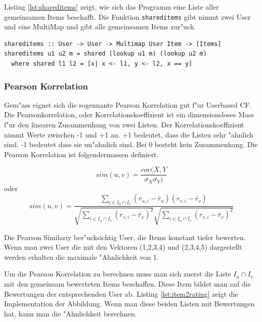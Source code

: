 \documentclass[a4paper, 12pt]{article}
\begin{document}
Listing \ref{lst:shareditems} zeigt, wie sich das Programm eine Liste aller gemeinsamen Items beschafft. Die Funktion \verb|shareditems| gibt nimmt zwei User und eine MultiMap und gibt alle gemeinsamen Items zur"uck. 

\begin{lstlisting}[caption=Implementation von shareditems, label=lst:shareditems]
shareditems :: User -> User -> Multimap User Item -> [Items]
shareditems u1 u2 m = shared (lookup u1 m) (lookup u2 m)
  where shared l1 l2 = [x| x <- l1, y <- l2, x == y]
\end{lstlisting}

\subsubsection{Pearson Korrelation}
\label{sec:pearsoncorrelation}

Gem"ass \cite{jannach11} eignet sich die sogennante Pearson Korrelation gut f"ur Userbased CF. Die Pearsonkorrelation, oder Korrelationskoeffizient ist ein dimensionsloses Mass f"ur den linearen Zusammenhang von zwei Listen. Der Korrelationskoeffizient nimmt Werte zwischen -1 und +1 an. +1 bedeutet, dass die Listen sehr "ahnlich sind. -1 bedeutet dass sie un"ahnlich sind. Bei 0 besteht kein Zusammenhang. Die Pearson Korrelation ist folgendermassen definiert.

\begin{equation}
 sim(u,v) = \frac{cov(X,Y}{\sigma_X \sigma_Y)} 
\end{equation}
oder
\begin{equation}
  \label{eq:pearson}
  sim(u,v)  = \frac{\sum_{i \in I_u \cap I_v}(r_{u,i} - \bar{r}_u)(r_{v,i} - \bar{r}_v)}{\sqrt{\sum_{i \in I_u \cap I_v}( r_{v,i} - \bar{r}_v)^2}\sqrt{\sum_{i \in I_u \cap I_v}( r_{v,i} - \bar{r}_v)^2}}
\end{equation}

Die Pearson Similariy ber"ucksichtig User, die Items konstant tiefer bewerten. Wenn man zwei User die mit den Vektoren (1,2,3,4) und (2,3,4,5) dargestellt werden erhalten die maximale "Ahnlichkeit von 1.

Um die Pearson Korrelation zu berechnen muss man sich zuerst die Liste $I_u \cap I_v$ mit den gemeinsam bewerteten Items beschaffen. Diese Item bildet man auf die Bewertungen der entsprechenden User ab. Listing \ref{lst:item2rating} zeigt die Implementation der Abbildung. Wenn man diese beiden Listen mit Bewertungen hat, kann man die "Ahnlichkeit berechnen.
\end{document}

